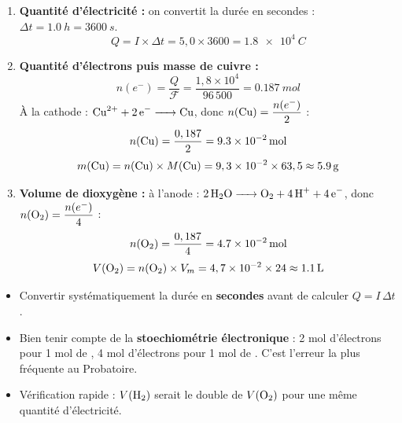 \documentclass[11pt]{article}
\begin{document}
\begin{corrige}
\begin{enumerate}
\item \textbf{Quantité d'électricité :} on convertit la durée en secondes : $\Delta t = \SI{1,0}{h} = \SI{3600}{s}$.
\[ Q = I \times \Delta t = 5,0 \times 3600 = \SI{1,8e4}{C} \]

\item \textbf{Quantité d'électrons puis masse de cuivre :}
\[ n(e^-) = \frac{Q}{\mathcal{F}} = \frac{1,8 \times 10^4}{96\,500} = \SI{0,187}{mol} \]
À la cathode : $\ce{Cu^2+ + 2e- -> Cu}$, donc $n(\ce{Cu}) = \dfrac{n(e^-)}{2}$ :
\[ n(\ce{Cu}) = \frac{0,187}{2} = \SI{9,3e-2}{mol} \]
\[ m(\ce{Cu}) = n(\ce{Cu}) \times M(\ce{Cu}) = 9,3 \times 10^{-2} \times 63,5 \approx \SI{5,9}{g} \]

\item \textbf{Volume de dioxygène :} à l'anode : $\ce{2H2O -> O2 + 4H+ + 4e-}$, donc $n(\ce{O2}) = \dfrac{n(e^-)}{4}$ :
\[ n(\ce{O2}) = \frac{0,187}{4} = \SI{4,7e-2}{mol} \]
\[ V(\ce{O2}) = n(\ce{O2}) \times V_m = 4,7 \times 10^{-2} \times 24 \approx \SI{1,1}{L} \]
\end{enumerate}
\end{corrige}

\begin{attention}
\begin{itemize}
\item Convertir systématiquement la durée en \textbf{secondes} avant de calculer $Q = I\,\Delta t$.
\item Bien tenir compte de la \textbf{stoechiométrie électronique} : 2 mol d'électrons pour 1 mol de , 4 mol d'électrons pour 1 mol de . C'est l'erreur la plus fréquente au Probatoire.
\item Vérification rapide : $V(\ce{H2})$ serait le double de $V(\ce{O2})$ pour une même quantité d'électricité.
\end{itemize}
\end{attention}
\end{document}

